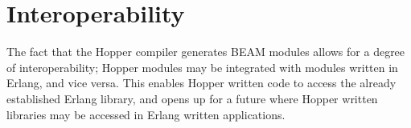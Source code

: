 \section{Interoperability}

The fact that the Hopper compiler generates BEAM modules allows for a degree of interoperability; Hopper modules may be integrated with modules written in Erlang, and vice versa. This enables Hopper written code to access the already established Erlang library, and opens up for a future where Hopper written libraries may be accessed in Erlang written applications.
